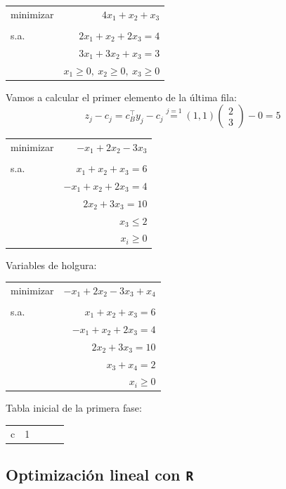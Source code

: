 \begin{example}
\begin{center}
\begin{tabular}{lr}
minimizar & $4x_1 + x_2 + x_3$ \\
	 &  \\
s.a. & $2x_1+x_2+2x_3 =4 $    \\
	 & $3x_1 + 3x_2 + x_3= 3$  \\
	 & $x_1\geq 0,\ x_2\geq 0,\ x_3\geq 0$
\end{tabular}
\end{center}

Vamos a calcular el primer elemento de la última fila:
\[z_j - c_j = c^\top_By_j - c_j \overset{j=1}{=} (1,1)\begin{pmatrix}2\\3\end{pmatrix}-0 = 5\]
\end{example}


\begin{example}

\begin{center}
\begin{tabular}{lr}
minimizar & $-x_1 + 2x_2 -3x_3$ \\
	 &  \\
s.a. & $x_1+x_2+x_3 =6 $    \\
	 & $-x_1 + x_2 + 2x_3  = 4$  \\
	 & $2x_2 + 3x_3  = 10$  \\
	 & $x_3  \leq 2$  \\
	 & $x_i\geq 0$
\end{tabular}
\end{center}

Variables de holgura:
\begin{center}
\begin{tabular}{lr}
minimizar & $-x_1 + 2x_2 -3x_3 + x_4$ \\
	 &  \\
s.a. & $x_1+x_2+x_3 =6 $    \\
	 & $-x_1 + x_2 + 2x_3  = 4$  \\
	 & $2x_2 + 3x_3  = 10$  \\
	 & $x_3 + x_4  = 2$  \\
	 & $x_i\geq 0$
\end{tabular}
\end{center}


Tabla inicial de la primera fase:

\begin{tabular}{ccccc}
c&1
\end{tabular}


\end{example}

\subsection{Optimización lineal con {\tt R}}


